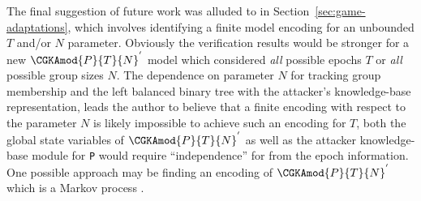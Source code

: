 The final suggestion of future work was alluded to in Section\ \ref{sec:game-adaptations}, which involves identifying a finite model encoding for an unbounded \(T\) and/or \(N\) parameter.
Obviously the verification results would be stronger for a new \( \CGKAmod{P}{T}{N}^{'} \) model which considered \emph{all} possible epochs \(T\) or \emph{all} possible group sizes \(N\).
The dependence on parameter \(N\) for tracking group membership and the left balanced binary tree with the attacker's knowledge-base representation, leads the author to believe that a finite encoding with respect to the parameter \(N\) is likely impossible to achieve such an encoding for \(T\), both the global state variables of \( \CGKAmod{P}{T}{N}^{'} \) as well as the attacker knowledge-base module for \texttt{P} would require ``independence'' for from the epoch information.  
One possible approach may be finding an encoding of \( \CGKAmod{P}{T}{N}^{'} \) which is a Markov process \autocite{markov1906a}.
